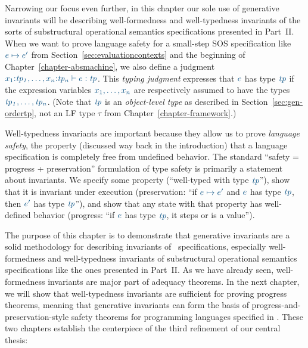 Narrowing our focus even further, in this chapter our sole use of
generative invariants will be describing well-formedness
and well-typedness invariants of the sorts of substructural
operational semantics specifications presented in Part~II.  When we
want to prove language safety for a small-step SOS specification like
$\obj{e \mapsto e'}$ from Section~\ref{sec:evaluationcontexts} and the
beginning of Chapter~\ref{chapter-absmachine}, we also define a
judgment $\obj{x_1{:}{\it tp_1},\ldots, x_n{:}{\it tp_n} \vdash e :
  {\it tp}}$.  This {\it typing judgment} expresses that $\obj{e}$ has
type $\obj{\it tp}$ if the expression variables $\obj{x_1, \ldots,
  x_n}$ are respectively assumed to have the types $\obj{\it tp_1,
  \ldots, tp_n}$. (Note that $\obj{\it tp}$ is an {\it object-level
  type} as described in Section~\ref{sec:gen-ordertp}, not an LF type
$\tau$ from Chapter~\ref{chapter-framework}.)

Well-typedness invariants are important because they allow us to prove
{\it language safety}, the property (discussed way back in the
introduction) that a language specification is completely free from
undefined behavior.  The standard ``safety = progress + preservation''
formulation of type safety is primarily a statement about
invariants. We specify some property (``well-typed with type $\obj{\it
  tp}$''), show that it is invariant under execution (preservation:
``if $\obj{e \mapsto e'}$ and $\obj{e}$ has type $\obj{\it tp}$, then
$\obj{e'}$ has type $\obj{\it tp}$''), and show that any state with
that property has well-defined behavior (progress: ``if $\obj{e}$ has
type $\obj{\it tp}$, it steps or is a value'').  

The purpose of this chapter is to demonstrate that generative
invariants are a solid methodology for describing invariants of
\sls~specifications, especially well-formedness and well-typedness
invariants of substructural operational semantics specifications like
the ones presented in Part~II. As we have already seen,
well-formedness invariants are major part of adequacy theorems. In the
next chapter, we will show that well-typedness invariants are
sufficient for proving progress theorems, meaning that generative
invariants can form the basis of progress-and-preservation-style
safety theorems for programming languages specified in \sls.
These two chapters establish the centerpiece of the third refinement
of our central thesis:

